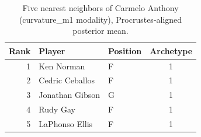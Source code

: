 \begin{table}[htbp]
  \centering\small
  \begin{tabular}{rllc}
    \toprule
    Rank & Player & Position & Archetype \\
    \midrule
    1 & Ken Norman & F & 1 \\
    2 & Cedric Ceballos & F & 1 \\
    3 & Jonathan Gibson & G & 1 \\
    4 & Rudy Gay & F & 1 \\
    5 & LaPhonso Ellis & F & 1 \\
    \bottomrule
  \end{tabular}
  \caption{Five nearest neighbors of Carmelo Anthony (curvature_m1 modality), Procrustes-aligned posterior mean.}
  \label{tab:Carmelo_Anthony_neighbors_curvature_m1}
\end{table}


